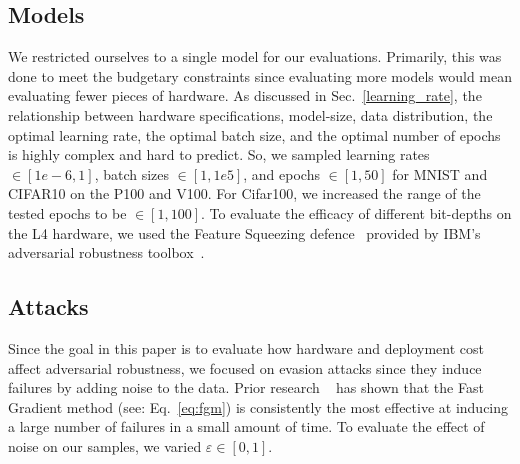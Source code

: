 \documentclass[conference]{IEEEtran}
\begin{document}
\subsection{Models}
We restricted ourselves to a single model for our evaluations. Primarily, this was done to meet the budgetary constraints since evaluating more models would mean evaluating fewer pieces of hardware. As discussed in Sec.~\ref{learning_rate}, the relationship between hardware specifications, model-size, data distribution, the optimal learning rate, the optimal batch size, and the optimal number of epochs is highly complex and hard to predict. So, we sampled learning rates $\in [1e-6, 1]$, batch sizes $\in [1, 1e5]$, and epochs $\in [1,50]$ for MNIST and CIFAR10 on the P100 and V100. For Cifar100, we increased the range of the tested epochs to be $\in [1, 100]$. To evaluate the efficacy of different bit-depths on the L4 hardware, we used the Feature Squeezing defence~\cite{feature_squeezing} provided by IBM's adversarial robustness toolbox~\cite{art2018}.

\subsection{Attacks}
Since the goal in this paper is to evaluate how hardware and deployment cost affect adversarial robustness, we focused on evasion attacks since they induce failures by adding noise to the data. Prior research ~\cite{meyers} has shown that the Fast Gradient method (see: Eq.~\ref{eq:fgm}) is consistently the most effective at inducing a large number of failures in a small amount of time. To evaluate the effect of noise on our samples, we varied $\varepsilon \in [0, 1]$.
\end{document}
